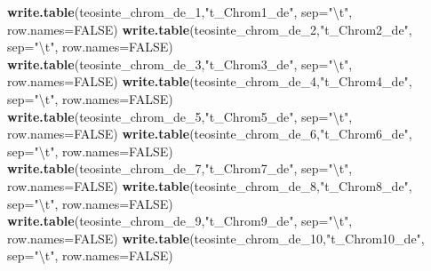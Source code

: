 \documentclass[]{article}
\newenvironment{Shaded}{\begin{snugshade}}{\end{snugshade}}
\newcommand{\CharTok}[1]{\textcolor[rgb]{0.31,0.60,0.02}{#1}}
\newcommand{\DataTypeTok}[1]{\textcolor[rgb]{0.13,0.29,0.53}{#1}}
\newcommand{\DecValTok}[1]{\textcolor[rgb]{0.00,0.00,0.81}{#1}}
\newcommand{\KeywordTok}[1]{\textcolor[rgb]{0.13,0.29,0.53}{\textbf{#1}}}
\newcommand{\NormalTok}[1]{#1}
\newcommand{\OtherTok}[1]{\textcolor[rgb]{0.56,0.35,0.01}{#1}}
\newcommand{\StringTok}[1]{\textcolor[rgb]{0.31,0.60,0.02}{#1}}
\begin{document}
\begin{Shaded}
\begin{Highlighting}[]
\KeywordTok{write.table}\NormalTok{(teosinte_chrom_de_}\DecValTok{1}\NormalTok{,}\StringTok{"t_Chrom1_de"}\NormalTok{, }\DataTypeTok{sep=}\StringTok{"}\CharTok{\textbackslash{}t}\StringTok{"}\NormalTok{, }\DataTypeTok{row.names=}\OtherTok{FALSE}\NormalTok{)}
\KeywordTok{write.table}\NormalTok{(teosinte_chrom_de_}\DecValTok{2}\NormalTok{,}\StringTok{"t_Chrom2_de"}\NormalTok{, }\DataTypeTok{sep=}\StringTok{"}\CharTok{\textbackslash{}t}\StringTok{"}\NormalTok{, }\DataTypeTok{row.names=}\OtherTok{FALSE}\NormalTok{)}
\KeywordTok{write.table}\NormalTok{(teosinte_chrom_de_}\DecValTok{3}\NormalTok{,}\StringTok{"t_Chrom3_de"}\NormalTok{, }\DataTypeTok{sep=}\StringTok{"}\CharTok{\textbackslash{}t}\StringTok{"}\NormalTok{, }\DataTypeTok{row.names=}\OtherTok{FALSE}\NormalTok{)}
\KeywordTok{write.table}\NormalTok{(teosinte_chrom_de_}\DecValTok{4}\NormalTok{,}\StringTok{"t_Chrom4_de"}\NormalTok{, }\DataTypeTok{sep=}\StringTok{"}\CharTok{\textbackslash{}t}\StringTok{"}\NormalTok{, }\DataTypeTok{row.names=}\OtherTok{FALSE}\NormalTok{)}
\KeywordTok{write.table}\NormalTok{(teosinte_chrom_de_}\DecValTok{5}\NormalTok{,}\StringTok{"t_Chrom5_de"}\NormalTok{, }\DataTypeTok{sep=}\StringTok{"}\CharTok{\textbackslash{}t}\StringTok{"}\NormalTok{, }\DataTypeTok{row.names=}\OtherTok{FALSE}\NormalTok{)}
\KeywordTok{write.table}\NormalTok{(teosinte_chrom_de_}\DecValTok{6}\NormalTok{,}\StringTok{"t_Chrom6_de"}\NormalTok{, }\DataTypeTok{sep=}\StringTok{"}\CharTok{\textbackslash{}t}\StringTok{"}\NormalTok{, }\DataTypeTok{row.names=}\OtherTok{FALSE}\NormalTok{)}
\KeywordTok{write.table}\NormalTok{(teosinte_chrom_de_}\DecValTok{7}\NormalTok{,}\StringTok{"t_Chrom7_de"}\NormalTok{, }\DataTypeTok{sep=}\StringTok{"}\CharTok{\textbackslash{}t}\StringTok{"}\NormalTok{, }\DataTypeTok{row.names=}\OtherTok{FALSE}\NormalTok{)}
\KeywordTok{write.table}\NormalTok{(teosinte_chrom_de_}\DecValTok{8}\NormalTok{,}\StringTok{"t_Chrom8_de"}\NormalTok{, }\DataTypeTok{sep=}\StringTok{"}\CharTok{\textbackslash{}t}\StringTok{"}\NormalTok{, }\DataTypeTok{row.names=}\OtherTok{FALSE}\NormalTok{)}
\KeywordTok{write.table}\NormalTok{(teosinte_chrom_de_}\DecValTok{9}\NormalTok{,}\StringTok{"t_Chrom9_de"}\NormalTok{, }\DataTypeTok{sep=}\StringTok{"}\CharTok{\textbackslash{}t}\StringTok{"}\NormalTok{, }\DataTypeTok{row.names=}\OtherTok{FALSE}\NormalTok{)}
\KeywordTok{write.table}\NormalTok{(teosinte_chrom_de_}\DecValTok{10}\NormalTok{,}\StringTok{"t_Chrom10_de"}\NormalTok{, }\DataTypeTok{sep=}\StringTok{"}\CharTok{\textbackslash{}t}\StringTok{"}\NormalTok{, }\DataTypeTok{row.names=}\OtherTok{FALSE}\NormalTok{)}
\end{Highlighting}
\end{Shaded}
\end{document}
